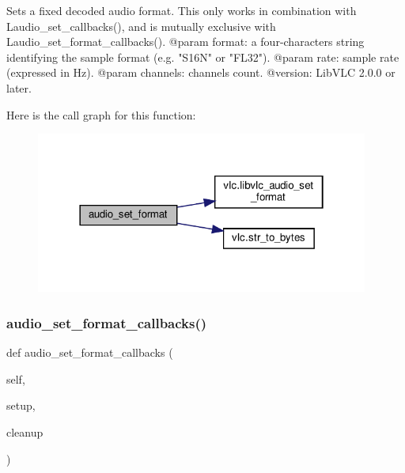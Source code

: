 \begin{DoxyVerb}Sets a fixed decoded audio format.
This only works in combination with L{audio_set_callbacks}(),
and is mutually exclusive with L{audio_set_format_callbacks}().
@param format: a four-characters string identifying the sample format (e.g. "S16N" or "FL32").
@param rate: sample rate (expressed in Hz).
@param channels: channels count.
@version: LibVLC 2.0.0 or later.
\end{DoxyVerb}
 Here is the call graph for this function\+:
\nopagebreak
\begin{figure}[H]
\begin{center}
\leavevmode
\includegraphics[width=310pt]{classvlc_1_1_media_player_adc106c83f7c6be94fcd6dcbe6242f72e_cgraph}
\end{center}
\end{figure}
\mbox{\label{classvlc_1_1_media_player_abe86fe67c8a476ce81fa2cdc67182843}} 
\subsubsection{\texorpdfstring{audio\+\_\+set\+\_\+format\+\_\+callbacks()}{audio\_set\_format\_callbacks()}}
{\footnotesize\ttfamily def audio\+\_\+set\+\_\+format\+\_\+callbacks (\begin{DoxyParamCaption}\item[{}]{self,  }\item[{}]{setup,  }\item[{}]{cleanup }\end{DoxyParamCaption})}

